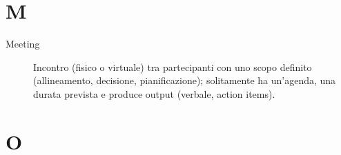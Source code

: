 \section*{M}
\begin{description}
    \item[Meeting] Incontro (fisico o virtuale) tra partecipanti con uno scopo definito (allineamento, decisione, pianificazione); solitamente ha un'agenda, una durata prevista e produce output (verbale, action items).
\end{description}

\section*{O}

